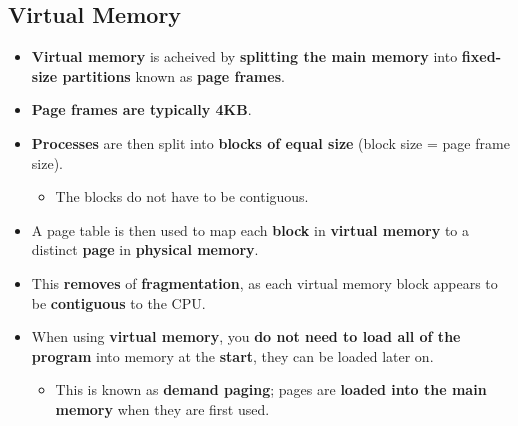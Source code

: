 \documentclass{article}
\begin{document}
    \subsection*{Virtual Memory}
    \begin{itemize}
        \item \textbf{Virtual memory} is acheived by \textbf{splitting the main memory} into \textbf{fixed-size partitions} known as \textbf{page frames}.
        \item \textbf{Page frames are typically 4KB}.
        \item \textbf{Processes} are then split into \textbf{blocks of equal size} (block size = page frame size).
        \begin{itemize}
            \item The blocks do not have to be contiguous.
        \end{itemize}
        \item A page table is then used to map each \textbf{block} in \textbf{virtual memory} to a distinct \textbf{page} in \textbf{physical memory}.
        \item This \textbf{removes} of \textbf{fragmentation}, as each virtual memory block appears to be \textbf{contiguous} to the CPU.
        \item When using \textbf{virtual memory}, you \textbf{do not need to load all of the program} into memory at the \textbf{start}, they can be loaded later on.
        \begin{itemize}
            \item This is known as \textbf{demand paging}; pages are \textbf{loaded into the main memory} when they are first used.
        \end{itemize}
    \end{itemize}
\end{document}
